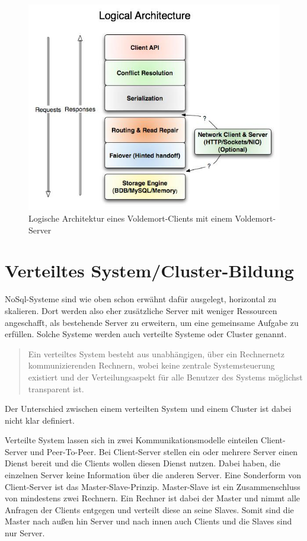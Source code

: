 \begin{figure}
    \centering
    \includegraphics[scale=0.5]{images/voldemort-architecture.jpeg}
    \caption{Logische Architektur eines Voldemort-Clients mit einem Voldemort-Server \cite{Voldemort2017}}
    \label{fig:voldemort-logical-architecture}
\end{figure}

\section{Verteiltes System/Cluster-Bildung}
NoSql-Systeme sind wie oben schon erwähnt dafür ausgelegt, horizontal zu
skalieren. Dort werden also eher zusätzliche Server mit weniger Ressourcen
angeschafft, als bestehende Server zu erweitern, um eine gemeinsame Aufgabe zu
erfüllen. Solche Systeme werden auch verteilte Systeme oder Cluster genannt.

\blockquote[\cite{Distener2012}]{Ein verteiltes System besteht aus unabhängigen,
über ein Rechnernetz kommunizierenden Rechnern, wobei keine zentrale
Systemsteuerung existiert und der Verteilungsaspekt für alle Benutzer des
Systems möglichst transparent ist.}

Der Unterschied zwischen einem verteilten System und einem Cluster
ist dabei nicht klar definiert.

Verteilte System lassen sich in zwei Kommunikationsmodelle einteilen
Client-Server und Peer-To-Peer. Bei Client-Server stellen ein oder mehrere
Server einen Dienst bereit und die Clients wollen diesen Dienst nutzen. Dabei
haben, die einzelnen Server keine Information über die anderen Server. Eine
Sonderform von Client-Server ist das Master-Slave-Prinzip. Master-Slave ist ein
Zusammenschluss von mindestens zwei Rechnern. Ein Rechner ist dabei der Master
und nimmt alle Anfragen der Clients entgegen und verteilt diese an seine
Slaves. Somit sind die Master nach außen hin Server und nach innen auch Clients
und die Slaves sind nur Server.

